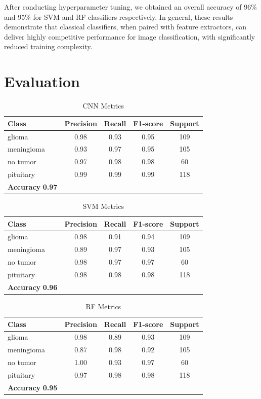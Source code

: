 \documentclass[conference]{IEEEtran}
\begin{document}
After conducting hyperparameter tuning, we obtained an overall accuracy of 96\% and 95\% for SVM and RF classifiers respectively. In general, these results demonstrate that classical classifiers, when paired with feature extractors, can deliver highly competitive performance for image classification, with significantly reduced training complexity.

\section{\large Evaluation}

\begin{table}[!ht]
\centering
\caption{CNN Metrics}
\begin{tabular}{lcccc}
\toprule
\textbf{Class} & \textbf{Precision} & \textbf{Recall} & \textbf{F1-score} & \textbf{Support} \\
\midrule
glioma     & 0.98 & 0.93 & 0.95 & 109 \\
meningioma & 0.93 & 0.97 & 0.95 & 105 \\
no tumor   & 0.97 & 0.98 & 0.98 & 60 \\
pituitary  & 0.99 & 0.99 & 0.99 & 118 \\
\midrule
\textbf{Accuracy} \textbf{0.97} \\
\bottomrule
\end{tabular}
\end{table}

\begin{table}[!ht]
\centering
\caption{SVM Metrics}
\begin{tabular}{lcccc}
\toprule
\textbf{Class} & \textbf{Precision} & \textbf{Recall} & \textbf{F1-score} & \textbf{Support} \\
\midrule
glioma     & 0.98 & 0.91 & 0.94 & 109 \\
meningioma & 0.89 & 0.97 & 0.93 & 105 \\
no tumor   & 0.98 & 0.97 & 0.97 & 60 \\
pituitary  & 0.98 & 0.98 & 0.98 & 118 \\
\midrule
\textbf{Accuracy} \textbf{0.96} \\
\bottomrule
\end{tabular}
\end{table}

\begin{table}[!ht]
\centering
\caption{RF Metrics}
\begin{tabular}{lcccc}
\toprule
\textbf{Class} & \textbf{Precision} & \textbf{Recall} & \textbf{F1-score} & \textbf{Support} \\
\midrule
glioma     & 0.98 & 0.89 & 0.93 & 109 \\
meningioma & 0.87 & 0.98 & 0.92 & 105 \\
no tumor   & 1.00 & 0.93 & 0.97 & 60 \\
pituitary  & 0.97 & 0.98 & 0.98 & 118 \\
\midrule
\textbf{Accuracy} \textbf{0.95} \\
\bottomrule
\end{tabular}
\end{table}
\end{document}
